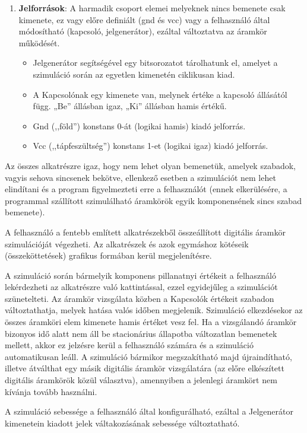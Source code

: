 \begin{enumerate}
\item \textbf{Jelforrások}: A harmadik csoport elemei melyeknek nincs bemenete csak kimenete, ez vagy előre definiált (gnd és vcc) vagy a felhasználó által módosítható (kapcsoló, jelgenerátor), ezáltal változtatva az áramkör működését.
\begin{itemize}
\setlength{\itemsep}{0cm}%
\setlength{\parskip}{0cm}%
\item Jelgenerátor segítségével egy bitsorozatot tárolhatunk el, amelyet a szimuláció során az egyetlen kimenetén ciklikusan kiad.
\item A Kapcsolónak egy kimenete van, melynek értéke a kapcsoló állásától függ. „Be” állásban igaz, „Ki” állásban hamis értékű.
\item Gnd (,,föld'') konstans 0-át (logikai hamis) kiadó jelforrás.
\item Vcc (,,tápfeszültség'') konstans 1-et (logikai igaz) kiadó jelforrás.
\end{itemize}
\end{enumerate}

Az összes alkatrészre igaz, hogy nem lehet olyan bemenetük, amelyek szabadok, vagyis sehova sincsenek bekötve, ellenkező esetben a szimulációt nem lehet elindítani és a program figyelmezteti erre a felhasználót (ennek elkerülésére, a programmal szállított szimulálható áramkörök egyik komponensének sincs szabad bemenete).

A felhasználó a fentebb említett alkatrészekből összeállított digitális áramkör szimulációját végezheti. Az alkatrészek és azok egymáshoz kötéseik (összeköttetések) grafikus formában kerül megjelenítésre.

A szimuláció során bármelyik komponens pillanatnyi értékeit a felhasználó lekérdezheti az alkatrészre való kattintással, ezzel egyidejűleg a szimulációt szünetelteti. Az áramkör vizsgálata közben a Kapcsolók értékeit szabadon változtathatja, melyek hatása valós időben megjelenik. Szimuláció elkezdésekor az összes áramköri elem kimenete hamis értéket vesz fel. Ha a vizsgálandó áramkör bizonyos idő alatt nem áll be stacionárius állapotba változatlan bemenetek mellett, akkor ez jelzésre kerül a felhasználó számára és a szimuláció automatikusan leáll. A szimuláció bármikor megszakítható majd újraindítható, illetve átválthat egy másik di\-gitális áramkör vizsgálatára (az előre elkészített digitális áramkörök közül választva), amennyiben a jelenlegi áramkört nem kívánja tovább használni.

A szimuláció sebessége a felhasználó által konfigurálható, ezáltal a Jelgenerátor kimenetein kiadott jelek váltakozásának sebessége változtatható.

